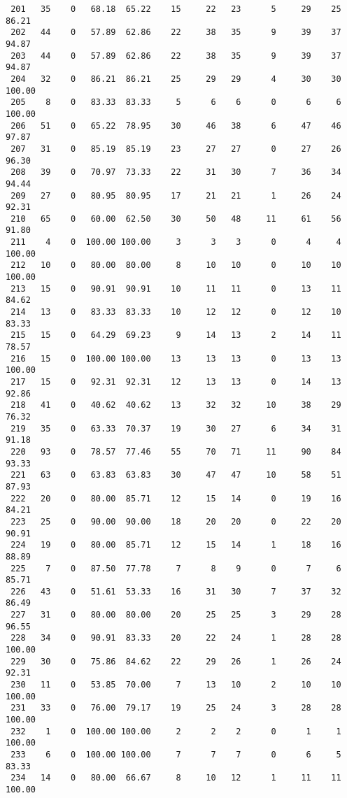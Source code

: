 \begin{verbatim}
 201   35    0   68.18  65.22    15     22   23      5     29    25    86.21
 202   44    0   57.89  62.86    22     38   35      9     39    37    94.87
 203   44    0   57.89  62.86    22     38   35      9     39    37    94.87
 204   32    0   86.21  86.21    25     29   29      4     30    30   100.00
 205    8    0   83.33  83.33     5      6    6      0      6     6   100.00
 206   51    0   65.22  78.95    30     46   38      6     47    46    97.87
 207   31    0   85.19  85.19    23     27   27      0     27    26    96.30
 208   39    0   70.97  73.33    22     31   30      7     36    34    94.44
 209   27    0   80.95  80.95    17     21   21      1     26    24    92.31
 210   65    0   60.00  62.50    30     50   48     11     61    56    91.80
 211    4    0  100.00 100.00     3      3    3      0      4     4   100.00
 212   10    0   80.00  80.00     8     10   10      0     10    10   100.00
 213   15    0   90.91  90.91    10     11   11      0     13    11    84.62
 214   13    0   83.33  83.33    10     12   12      0     12    10    83.33
 215   15    0   64.29  69.23     9     14   13      2     14    11    78.57
 216   15    0  100.00 100.00    13     13   13      0     13    13   100.00
 217   15    0   92.31  92.31    12     13   13      0     14    13    92.86
 218   41    0   40.62  40.62    13     32   32     10     38    29    76.32
 219   35    0   63.33  70.37    19     30   27      6     34    31    91.18
 220   93    0   78.57  77.46    55     70   71     11     90    84    93.33
 221   63    0   63.83  63.83    30     47   47     10     58    51    87.93
 222   20    0   80.00  85.71    12     15   14      0     19    16    84.21
 223   25    0   90.00  90.00    18     20   20      0     22    20    90.91
 224   19    0   80.00  85.71    12     15   14      1     18    16    88.89
 225    7    0   87.50  77.78     7      8    9      0      7     6    85.71
 226   43    0   51.61  53.33    16     31   30      7     37    32    86.49
 227   31    0   80.00  80.00    20     25   25      3     29    28    96.55
 228   34    0   90.91  83.33    20     22   24      1     28    28   100.00
 229   30    0   75.86  84.62    22     29   26      1     26    24    92.31
 230   11    0   53.85  70.00     7     13   10      2     10    10   100.00
 231   33    0   76.00  79.17    19     25   24      3     28    28   100.00
 232    1    0  100.00 100.00     2      2    2      0      1     1   100.00
 233    6    0  100.00 100.00     7      7    7      0      6     5    83.33
 234   14    0   80.00  66.67     8     10   12      1     11    11   100.00

\end{verbatim}
